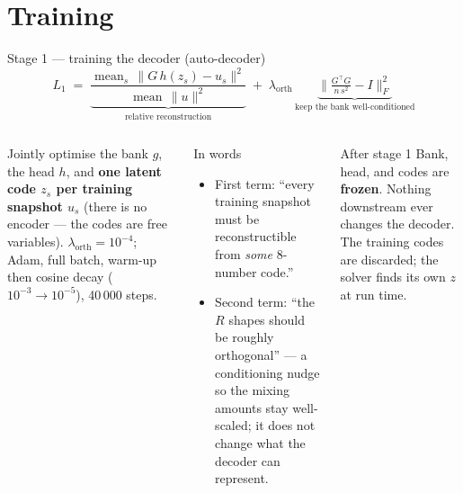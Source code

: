 \documentclass[10pt,aspectratio=169]{beamer}
\newcommand{\T}{^{\top}}
\begin{document}
\section{Training}
\begin{frame}{Stage 1 --- training the decoder (auto-decoder)}
  \[
    L_1 \;=\; \underbrace{\frac{\operatorname{mean}_s\,\|G\,h(z_s)-u_s\|^2}{\operatorname{mean}\,\|u\|^2}}_{\text{relative reconstruction}}
    \;+\; \lambda_{\mathrm{orth}}\,\underbrace{\Big\|\tfrac{G\T G}{n\,s^{2}}-I\Big\|_F^{2}}_{\text{keep the bank well-conditioned}}
  \]
  \footnotesize
  \begin{columns}[T]
    Jointly optimise the bank $g$, the head $h$, and \textbf{one latent code $z_s$ per training snapshot $u_s$}
    (there is no encoder --- the codes are free variables). $\lambda_{\mathrm{orth}}=10^{-4}$; Adam, full batch, warm-up then cosine decay ($10^{-3}\to10^{-5}$), 40\,000 steps.
    \begin{block}{In words}
      \begin{itemize}
        \item First term: ``every training snapshot must be reconstructible from \emph{some} 8-number code.''
        \item Second term: ``the $R$ shapes should be roughly orthogonal'' --- a conditioning nudge so the mixing amounts stay well-scaled; it does not change what the decoder can represent.
      \end{itemize}
    \end{block}
    \begin{alertblock}{After stage 1}
      Bank, head, and codes are \textbf{frozen}. Nothing downstream ever changes the decoder.
      The training codes are discarded; the solver finds its own $z$ at run time.
    \end{alertblock}
  \end{columns}
\end{frame}
\end{document}
